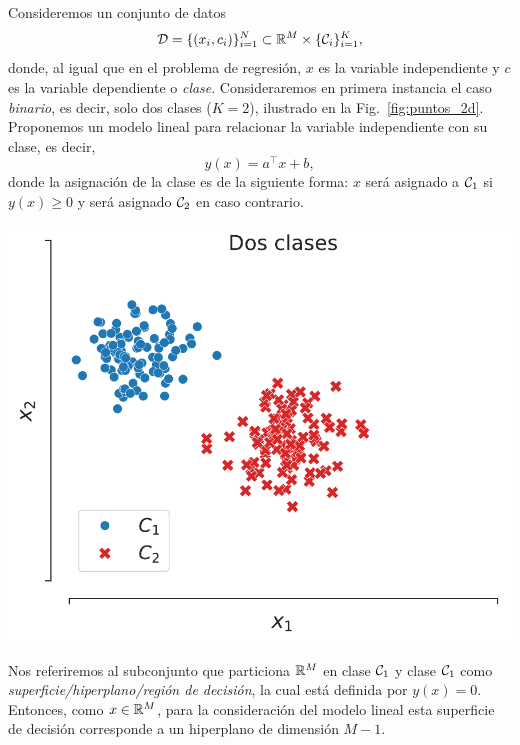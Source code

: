 \noindent\begin{minipage}{0.52\textwidth}
	Consideremos un conjunto de datos
	\begin{equation}
	 	{\mathcal D} = \{(x_i,c_i)\}_{i=1}^N\subset{\mathbb R}^M\times\{{\mathcal C}_i\}_{i=1}^K,
	 \end{equation}
	 donde, al igual que en el problema de regresión, $x$ es la variable independiente y $c$ es la variable dependiente o \emph{clase}. Consideraremos en primera instancia el caso \emph{binario}, es decir, solo dos clases ($K=2$), ilustrado en la Fig.~\ref{fig:puntos_2d}. Proponemos un modelo lineal para relacionar la variable independiente con su clase, es decir, 
	\begin{equation}
		y(x) = a^\top  x + b,
		\label{eq:clasificacion_lineal}
	\end{equation}
	donde la  asignación de la clase es de la siguiente forma: $x$ será asignado a ${\mathcal C}_1$ si $y(x) \geq 0$ y será asignado ${\mathcal C}_2$ en caso contrario.
\end{minipage}\hfill
\begin{minipage}{0.46\textwidth}
	\centering
	\includegraphics[width=\textwidth]{img/cap2_dosclases}\\
	\label{fig:puntos_2d}
\end{minipage}

\vspace{1cm}
Nos referiremos al subconjunto que particiona ${\mathbb R}^M$ en clase ${\mathcal C}_1$ y clase ${\mathcal C}_1$ como \emph{superficie/hiperplano/región de decisión}, la cual está definida por $y(x)=0$. Entonces, como $x\in{\mathbb R}^M$, para la consideración del modelo lineal esta superficie de decisión corresponde a un hiperplano de dimensión $M-1$.

